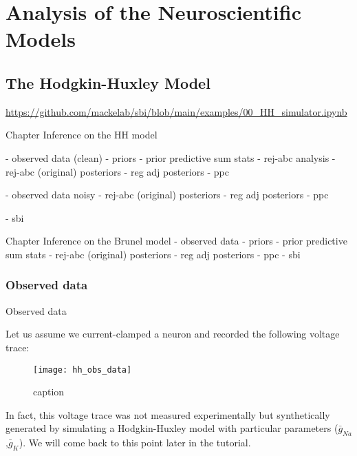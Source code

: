 \chapter{Analysis of the Neuroscientific Models}


\section{The Hodgkin-Huxley Model}


\url{https://github.com/mackelab/sbi/blob/main/examples/00_HH_simulator.ipynb}

Chapter Inference on the HH model 

- observed data (clean)
- priors
- prior predictive sum stats 
- rej-abc analysis 
- rej-abc (original) posteriors 
- reg adj posteriors
- ppc 

- observed data noisy 
- rej-abc (original) posteriors 
- reg adj posteriors
- ppc 

- sbi

Chapter Inference on the Brunel model
- observed data 
- priors
- prior predictive sum stats 
- rej-abc (original) posteriors 
- reg adj posteriors
- ppc 
- sbi

\subsection{Observed data}

Observed data 

Let us assume we current-clamped a neuron and recorded the following voltage trace:

\begin{figure}[H]
    \centering
    \texttt{[image: hh\_obs\_data]}
    \caption{caption}
    \label{fig:fig1}
\end{figure} 

In fact, this voltage trace was not measured experimentally but synthetically generated by simulating a Hodgkin-Huxley model with particular parameters ($\bar g_{Na}$,$\bar g_K$). We will come back to this point later in the tutorial.

